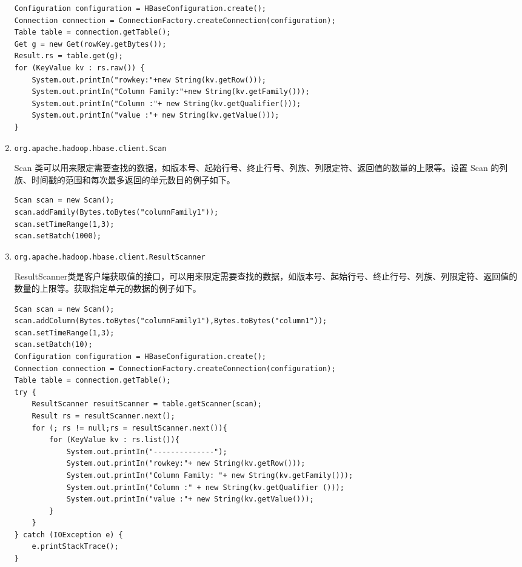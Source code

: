 \begin{enumerate}[1)]
\begin{lstlisting}[style=customjava]
Configuration configuration = HBaseConfiguration.create();
Connection connection = ConnectionFactory.createConnection(configuration);
Table table = connection.getTable();
Get g = new Get(rowKey.getBytes());
Result.rs = table.get(g);
for (KeyValue kv : rs.raw()) {
	System.out.printIn("rowkey:"+new String(kv.getRow()));
	System.out.printIn("Column Family:"+new String(kv.getFamily()));
	System.out.printIn("Column :"+ new String(kv.getQualifier()));
	System.out.printIn("value :"+ new String(kv.getValue()));
}
\end{lstlisting}


\item \lstinline{org.apache.hadoop.hbase.client.Scan}

Scan 类可以用来限定需要查找的数据，如版本号、起始行号、终止行号、列族、列限定符、返回值的数量的上限等。设置 Scan 的列族、时间戳的范围和每次最多返回的单元数目的例子如下。

\begin{lstlisting}[style=customjava]
Scan scan = new Scan();
scan.addFamily(Bytes.toBytes("columnFamily1"));
scan.setTimeRange(1,3);
scan.setBatch(1000);
\end{lstlisting}


\item \lstinline{org.apache.hadoop.hbase.client.ResultScanner}

ResultScanner类是客户端获取值的接口，可以用来限定需要查找的数据，如版本号、起始行号、终止行号、列族、列限定符、返回值的数量的上限等。获取指定单元的数据的例子如下。

\begin{lstlisting}[style=customjava]
Scan scan = new Scan();
scan.addColumn(Bytes.toBytes("columnFamily1"),Bytes.toBytes("column1")); 
scan.setTimeRange(1,3);
scan.setBatch(10);
Configuration configuration = HBaseConfiguration.create();
Connection connection = ConnectionFactory.createConnection(configuration);
Table table = connection.getTable();
try {
	ResultScanner resuitScanner = table.getScanner(scan);
	Result rs = resultScanner.next();
	for (; rs != null;rs = resultScanner.next()){
		for (KeyValue kv : rs.list()){
			System.out.printIn("--------------");
			System.out.printIn("rowkey:"+ new String(kv.getRow()));
			System.out.printIn("Column Family: "+ new String(kv.getFamily()));
			System.out.printIn("Column :" + new String(kv.getQualifier ()));
			System.out.printIn("value :"+ new String(kv.getValue()));
		}
	}
} catch (IOException e) {
	e.printStackTrace();
}
\end{lstlisting}
\end{enumerate}


